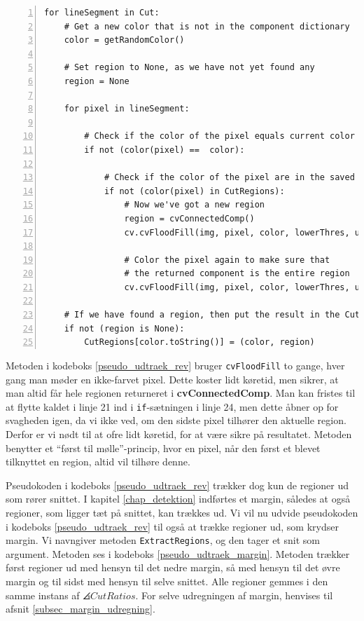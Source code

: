 {\begin{lstlisting}[caption={Revideret pseudokode til udtrækning af
    regioner. Returnerer ingen
    duplikater.},captionpos=b,label={pseudo_udtraek_rev},numbers=left,
    frame=tb, breaklines=false, float=p]
for lineSegment in Cut:
    # Get a new color that is not in the component dictionary
    color = getRandomColor()

    # Set region to None, as we have not yet found any
    region = None

    for pixel in lineSegment:

        # Check if the color of the pixel equals current color
        if not (color(pixel) ==  color):

            # Check if the color of the pixel are in the saved regions
            if not (color(pixel) in CutRegions):
                # Now we've got a new region
                region = cvConnectedComp()
                cv.cvFloodFill(img, pixel, color, lowerThres, upperThres, region)

                # Color the pixel again to make sure that
                # the returned component is the entire region
                cv.cvFloodFill(img, pixel, color, lowerThres, upperThres, region)

    # If we have found a region, then put the result in the CutRegions-dictionary
    if not (region is None):
        CutRegions[color.toString()] = (color, region)
\end{lstlisting}

Metoden i kodeboks \ref{pseudo_udtraek_rev} bruger \texttt{cvFloodFill}
to gange, hver gang man møder en ikke-farvet pixel. Dette koster lidt
køretid, men sikrer, at man altid får hele regionen returneret i
\textbf{cvConnectedComp}. Man kan fristes til at flytte kaldet i linje
21 ind i \texttt{if}-sætningen i linje 24, men dette åbner op for
svagheden igen, da vi ikke ved, om den sidste pixel tilhører den
aktuelle region. Derfor er vi nødt til at ofre lidt køretid, for at
være sikre på resultatet. Metoden benytter et ``først til
mølle''-princip, hvor en pixel, når den først et blevet tilknyttet en
region, altid vil tilhøre denne.

Pseudokoden i kodeboks \ref{pseudo_udtraek_rev} trækker dog kun de
regioner ud som rører snittet. I kapitel \ref{chap_detektion} indførtes
et margin, således at også regioner, som ligger tæt på snittet, kan
trækkes ud. Vi vil nu udvide pseudokoden i kodeboks
\ref{pseudo_udtraek_rev} til også at trække regioner ud, som krydser
margin. Vi navngiver metoden \texttt{ExtractRegions}, og den tager et
snit som argument. Metoden ses i kodeboks
\ref{pseudo_udtraek_margin}. Metoden trækker først regioner ud med
hensyn til det nedre margin, så med hensyn til det øvre margin og til
sidst med hensyn til selve snittet. Alle regioner gemmes i den samme
instans af $\angles{CutRatios}$. For selve udregningen af margin,
henvises til afsnit \ref{subsec_margin_udregning}.

}
